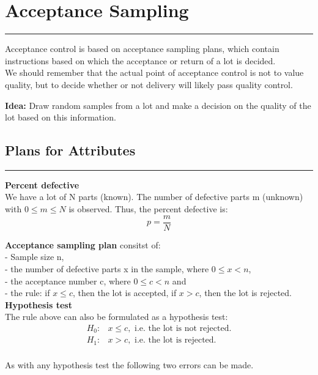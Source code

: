 \section{Acceptance Sampling}
\noindent\rule[\linienAbstand]{\linewidth}{\linienDickeDick}
Acceptance control is based on acceptance sampling plans, which contain instructions based on which the acceptance or return of a lot is decided.\\
We should remember that the actual point of acceptance control is not to value quality, but to decide whether or not delivery will likely pass quality control.

\textbf{Idea:} Draw random samples from a lot and make a decision on the quality of the lot based on this information.

\subsection{Plans for Attributes}
\noindent\rule[\linienAbstand]{\linewidth}{\linienDicke}
\textbf{Percent defective}\\
We have a lot of N parts (known). The number of defective parts m (unknown) with $0 \leq m \leq N$ is observed. Thus, the percent defective is:
\begin{equation}
  p = \frac{m}{N}
\end{equation}

\textbf{Acceptance sampling plan} consitst of:\\
 - Sample size n,\\
 - the number of defective parts x in the sample, where $0 \leq x < n$,\\
 - the acceptance number c, where $0 \leq c < n$ and\\
 - the rule: if $x \leq c$, then the lot is accepted, if $x > c$, then the lot is rejected.\\

\textbf{Hypothesis test}\\
The rule above can also be formulated as a hypothesis test:
\begin{equation}
  \begin{split}
    H_0:& x \leq c,\text{ i.e. the lot is not rejected.}\\
    H_1:& x > c,\text{ i.e. the lot is rejected.}\\
  \end{split}
\end{equation}

As with any hypothesis test the following two errors can be made.\\

